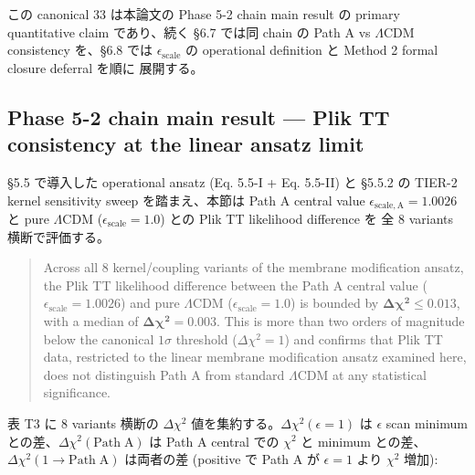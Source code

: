 \documentclass[11pt,a4paper]{ltjsarticle}
\begin{document}
\noindent
この canonical 33 は本論文の Phase 5-2 chain main result の primary
quantitative claim であり、続く \S 6.7 では同 chain の Path A vs
$\Lambda$CDM consistency を、\S 6.8 では $\epsilon_{\mathrm{scale}}$ の
operational definition と Method 2 formal closure deferral を順に
展開する。


\subsection{Phase 5-2 chain main result --- Plik TT consistency at the linear ansatz limit}

\S 5.5 で導入した operational ansatz (Eq. 5.5-I + Eq. 5.5-II) と
\S 5.5.2 の TIER-2 kernel sensitivity sweep を踏まえ、本節は Path A central
value $\epsilon_{\mathrm{scale,A}} = 1.0026$ と pure $\Lambda$CDM
($\epsilon_{\mathrm{scale}} = 1.0$) との Plik TT likelihood difference を
全 8 variants 横断で評価する。

\begin{quote}
Across all 8 kernel/coupling variants of the membrane modification
ansatz, the Plik TT likelihood difference between the Path A central
value ($\epsilon_{\mathrm{scale}} = 1.0026$) and pure $\Lambda$CDM
($\epsilon_{\mathrm{scale}} = 1.0$) is bounded by
$\boldsymbol{\Delta\chi^2 \leq 0.013}$, with a median of
$\boldsymbol{\Delta\chi^2 = 0.003}$.
This is more than two orders of magnitude below the canonical $1\sigma$
threshold ($\Delta\chi^2 = 1$) and confirms that Plik TT data, restricted
to the linear membrane modification ansatz examined here, does not
distinguish Path A from standard $\Lambda$CDM at any statistical
significance.
\end{quote}

\noindent
表 T3 に 8 variants 横断の $\Delta\chi^2$ 値を集約する。$\Delta\chi^2(\epsilon=1)$
は $\epsilon$ scan minimum との差、$\Delta\chi^2(\mathrm{Path\;A})$ は
Path A central での $\chi^2$ と minimum との差、$\Delta\chi^2(1 \to \mathrm{Path\;A})$
は両者の差 (positive で Path A が $\epsilon=1$ より $\chi^2$ 増加):
\end{document}
